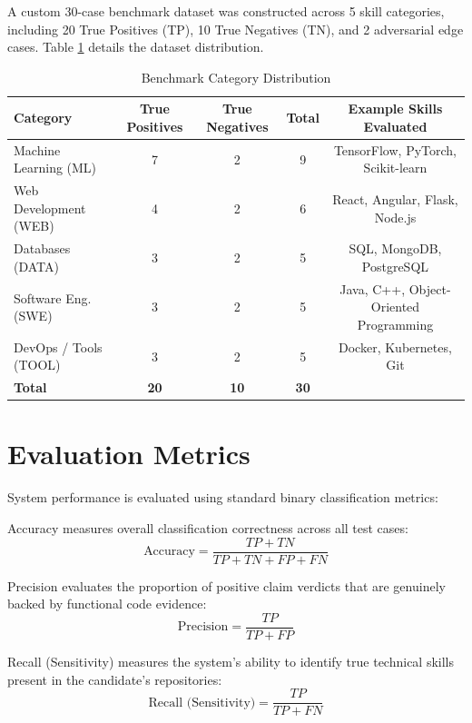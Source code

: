 A custom 30-case benchmark dataset was constructed across 5 skill categories, including 20 True Positives (TP), 10 True Negatives (TN), and 2 adversarial edge cases. Table \ref{tab:benchmark} details the dataset distribution.

\begin{table}[htbp]
\centering
\small
\setlength{\tabcolsep}{10pt}
\caption{Benchmark Category Distribution}
\label{tab:benchmark}
\begin{tabularx}{\textwidth}{@{}X c c c c@{}}
\toprule
\textbf{Category} & \textbf{True Positives} & \textbf{True Negatives} & \textbf{Total} & \textbf{Example Skills Evaluated} \\ \midrule
Machine Learning (ML) & 7 & 2 & 9 & TensorFlow, PyTorch, Scikit-learn \\
Web Development (WEB) & 4 & 2 & 6 & React, Angular, Flask, Node.js \\
Databases (DATA) & 3 & 2 & 5 & SQL, MongoDB, PostgreSQL \\
Software Eng. (SWE) & 3 & 2 & 5 & Java, C++, Object-Oriented Programming \\
DevOps / Tools (TOOL) & 3 & 2 & 5 & Docker, Kubernetes, Git \\ \midrule
\textbf{Total} & \textbf{20} & \textbf{10} & \textbf{30} & \\ \bottomrule
\end{tabularx}
\end{table}

\section{Evaluation Metrics}

System performance is evaluated using standard binary classification metrics:

Accuracy measures overall classification correctness across all test cases:
\begin{equation}
\text{Accuracy} = \frac{TP + TN}{TP + TN + FP + FN}
\end{equation}

Precision evaluates the proportion of positive claim verdicts that are genuinely backed by functional code evidence:
\begin{equation}
\text{Precision} = \frac{TP}{TP + FP}
\end{equation}

Recall (Sensitivity) measures the system's ability to identify true technical skills present in the candidate's repositories:
\begin{equation}
\text{Recall (Sensitivity)} = \frac{TP}{TP + FN}
\end{equation}

